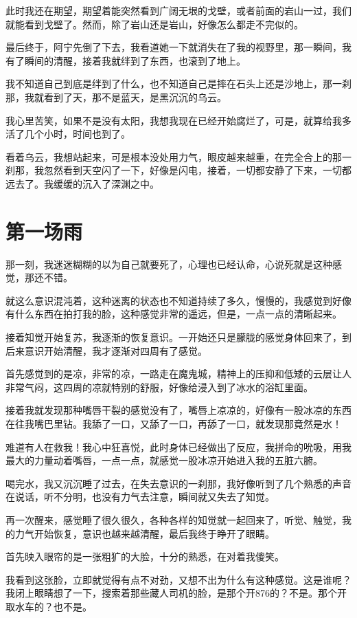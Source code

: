 此时我还在期望，期望着能突然看到广阔无垠的戈壁，或者前面的岩山一过，我们就能看到戈壁了。然而，除了岩山还是岩山，好像怎么都走不完似的。

最后终于，阿宁先倒了下去，我看道她一下就消失在了我的视野里，那一瞬间，我有了瞬间的清醒，接着我就绊到了东西，也滚到了地上。

我不知道自己到底是绊到了什么，也不知道自己是摔在石头上还是沙地上，那一刹那，我就看到了天，那不是蓝天，是黑沉沉的乌云。

我心里苦笑，如果不是没有太阳，我想我现在已经开始腐烂了，可是，就算给我多活了几个小时，时间也到了。

看着乌云，我想站起来，可是根本没处用力气，眼皮越来越重，在完全合上的那一刹那，我忽然看到天空闪了一下，好像是闪电，接着，一切都安静了下来，一切都远去了。我缓缓的沉入了深渊之中。

\chapter{第一场雨}

那一刻，我迷迷糊糊的以为自己就要死了，心理也已经认命，心说死就是这种感觉，那还不错。

就这么意识混沌着，这种迷离的状态也不知道持续了多久，慢慢的，我感觉到好像有什么东西在拍打我的脸，这种感觉非常的遥远，但是，一点一点的清晰起来。

接着知觉开始复苏，我逐渐的恢复意识。一开始还只是朦胧的感觉身体回来了，到后来意识开始清醒，我才逐渐对四周有了感觉。

首先感觉到的是凉，非常的凉，一路走在魔鬼城，精神上的压抑和低矮的云层让人非常气闷，这四周的凉就特别的舒服，好像给浸入到了冰水的浴缸里面。

接着我就发现那种嘴唇干裂的感觉没有了，嘴唇上凉凉的，好像有一股冰凉的东西在往我嘴巴里钻。我舔了一口，又舔了一口，再舔了一口，就发现那竟然是水！

难道有人在救我！我心中狂喜悦，此时身体已经做出了反应，我拼命的吮吸，用我最大的力量动着嘴唇，一点一点，就感觉一股冰凉开始进入我的五脏六腑。

喝完水，我又沉沉睡了过去，在失去意识的一刹那，我好像听到了几个熟悉的声音在说话，听不分明，也没有力气去注意，瞬间就又失去了知觉。

再一次醒来，感觉睡了很久很久，各种各样的知觉就一起回来了，听觉、触觉，我的力气开始恢复，意识也越来越清醒，最后我终于睁开了眼睛。

首先映入眼帘的是一张粗犷的大脸，十分的熟悉，在对着我傻笑。

我看到这张脸，立即就觉得有点不对劲，又想不出为什么有这种感觉。这是谁呢？我闭上眼睛想了一下，搜索着那些藏人司机的脸，是那个开876的？不是。那个开取水车的？也不是。


